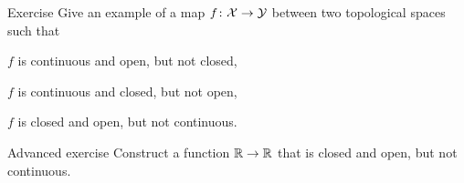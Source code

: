 \begin{thm}{Exercise}\label{ex:closed-open-cont}
Give an example of a map $f\colon\mathcal{X}\to\mathcal{Y}$ between two topological spaces such that 
\begin{subthm}{}
$f$ is continuous and open, but not closed,
\end{subthm}

\begin{subthm}{}
$f$ is continuous and closed, but not open,
\end{subthm}

\begin{subthm}{}
$f$ is closed and open, but not continuous.
\end{subthm}

\end{thm}

\begin{thm}{Advanced exercise}\label{ex:closed-open-cont-R}
Construct a function $\mathbb{R}\to\mathbb{R}$ that is closed and open, but not continuous.
\end{thm}


